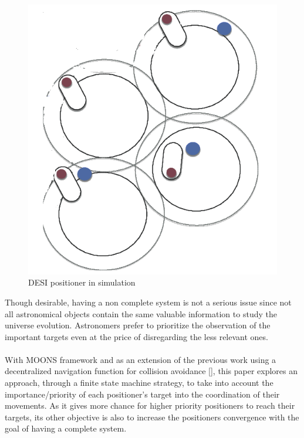 \documentclass[]{spie}  %
\begin{document}
\begin{figure}[H]
\begin{minipage}[t]{5cm}
			\includegraphics[scale=0.3]{images/DESI_Positioner.png}
			\caption{DESI positioner in simulation}
			\label{DESI_positioner_representation}
		\end{minipage}
	\end{figure}
			
	Though desirable, having a non complete system is not a serious issue since not all astronomical objects contain the same valuable information to study the universe evolution. Astronomers prefer to prioritize the observation of the important targets even at the price of disregarding the less relevant ones.\\\\
	With MOONS framework and as an extension of the previous work using a decentralized navigation function for collision avoidance [], this paper explores an approach, through a finite state machine strategy, to take into account the importance/priority of each positioner's target into the coordination of their movements. As it gives more chance for higher priority positioners to reach their targets, its other objective is also to increase the positioners convergence with the goal of having a complete system.\\
		
\end{document}
